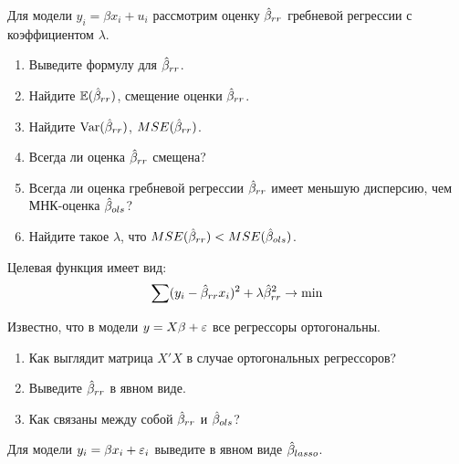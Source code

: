 \begin{problem}
Для модели $y_i=\beta x_i+u_i$ рассмотрим оценку $\hat{\beta}_{rr}$ гребневой регрессии с коэффициентом $\lambda$.

\begin{enumerate}
\item Выведите формулу для $\hat{\beta}_{rr}$.
\item Найдите $\mathbb{E}(\hat{\beta}_{rr})$, смещение оценки $\hat{\beta}_{rr}$.
\item Найдите $\operatorname{Var}(\hat{\beta}_{rr})$, $MSE(\hat{\beta}_{rr})$.
\item Всегда ли оценка $\hat{\beta}_{rr}$ смещена?
\item Всегда ли оценка гребневой регрессии $\hat{\beta}_{rr}$ имеет меньшую дисперсию, чем МНК-оценка $\hat{\beta}_{ols}$?
\item Найдите такое $\lambda$, что $MSE(\hat{\beta}_{rr})<MSE(\hat{\beta}_{ols})$.
\end{enumerate}

\begin{sol}
Целевая функция имеет вид:
  \[
\sum (y_i - \hat{\beta}_{rr} x_i)^2 + \lambda \hat{\beta}_{rr}^2 \rightarrow \min 
\]
\end{sol}
\end{problem}




\begin{problem}
Известно, что в модели $y=X\beta+\varepsilon$ все регрессоры ортогональны.
\begin{enumerate}
\item Как выглядит матрица $X'X$ в случае ортогональных регрессоров?
\item Выведите $\hat{\beta}_{rr}$ в явном виде.
\item Как связаны между собой $\hat{\beta}_{rr}$ и $\hat{\beta}_{ols}$?
\end{enumerate}

\begin{sol}
\end{sol}
\end{problem}



\begin{problem}
Для модели $y_i=\beta x_i + \varepsilon_i$ выведите в явном виде $\hat{\beta}_{lasso}$.

\begin{sol}
\end{sol}
\end{problem}



